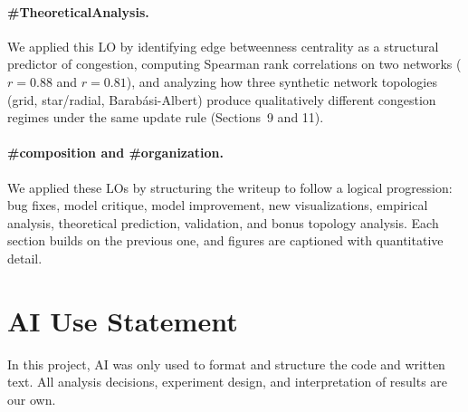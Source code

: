 \documentclass[12pt]{article}
\begin{document}
\paragraph{\#TheoreticalAnalysis.}
We applied this LO by identifying edge betweenness centrality as a structural predictor of congestion, computing Spearman rank correlations on two networks ($r = 0.88$ and $r = 0.81$), and analyzing how three synthetic network topologies (grid, star/radial, Barab\'{a}si-Albert) produce qualitatively different congestion regimes under the same update rule (Sections~9 and 11).

\paragraph{\#composition and \#organization.}
We applied these LOs by structuring the writeup to follow a logical progression: bug fixes, model critique, model improvement, new visualizations, empirical analysis, theoretical prediction, validation, and bonus topology analysis. Each section builds on the previous one, and figures are captioned with quantitative detail.

\section*{AI Use Statement}

In this project, AI was only used to format and structure the code and written text. All analysis decisions, experiment design, and interpretation of results are our own.


\end{document}

